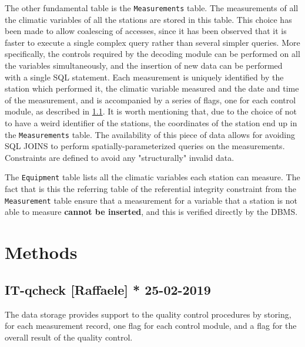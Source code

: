 \documentclass[authoryear,preprint,review,12pt]{elsarticle}
\begin{document}
The other fundamental table is the \texttt{Measurements} table. The measurements of all the climatic variables of all the stations are stored in this table. This choice has been made to allow coalescing of accesses, since it has been observed that it is faster to execute a single complex query rather than several simpler queries. More specifically, the controls required by the decoding module can be performed on all the variables simultaneously, and the insertion of new data can be performed with a single SQL statement. Each measurement is uniquely identified by the station which performed it, the climatic variable measured and the date and time of the measurement, and is accompanied by a series of flags, one for each control module, as described in \cref{controlFlags}. It is worth mentioning that, due to the choice of not to have a weird identifier of the stations, the coordinates of the station end up in the \texttt{Measurements} table. The availability of this piece of data allows for avoiding SQL JOINS to perform spatially-parameterized queries on the measurements. Constraints are defined to avoid any "structurally" invalid data.

The \texttt{Equipment} table lists all the climatic variables each station can measure. The fact that is this the referring table of the referential integrity constraint from the \texttt{Measurement} table ensure that a measurement for a variable that a station is not able to measure \textbf{cannot be inserted}, and this is verified directly by the DBMS.


\section{Methods}
\subsection{IT-qcheck [Raffaele] * 25-02-2019}\label{controlFlags}
The data storage provides support to the quality control procedures by storing, for each measurement record, one flag for each control module, and a flag for the overall result of the quality control.
\end{document}
